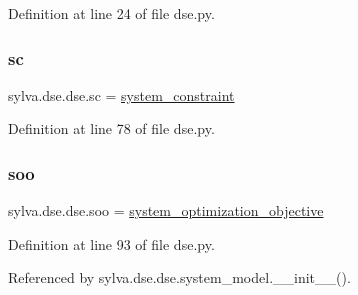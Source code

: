 Definition at line 24 of file dse.\+py.

\mbox{\label{namespacesylva_1_1dse_1_1dse_ac2d9fdcc3f7fd0bad1900fa0a813dff4}} 
\subsubsection{\texorpdfstring{sc}{sc}}
{\footnotesize\ttfamily sylva.\+dse.\+dse.\+sc = \hyperlink{classsylva_1_1dse_1_1dse_1_1system__constraint}{system\+\_\+constraint}}



Definition at line 78 of file dse.\+py.

\mbox{\label{namespacesylva_1_1dse_1_1dse_ab54fbae03bc2c432fecd4486e623af71}} 
\subsubsection{\texorpdfstring{soo}{soo}}
{\footnotesize\ttfamily sylva.\+dse.\+dse.\+soo = \hyperlink{classsylva_1_1dse_1_1dse_1_1system__optimization__objective}{system\+\_\+optimization\+\_\+objective}}



Definition at line 93 of file dse.\+py.



Referenced by sylva.\+dse.\+dse.\+system\+\_\+model.\+\_\+\+\_\+init\+\_\+\+\_\+().

